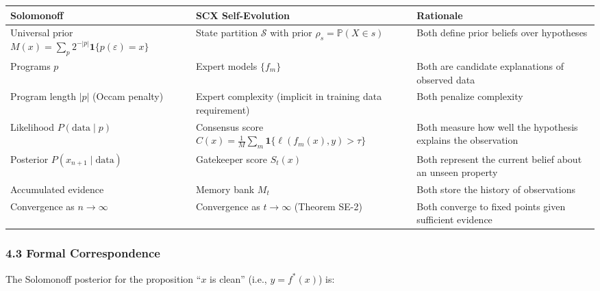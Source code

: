 \documentclass[
  12pt,
]{ctexart}
\begin{document}
\begin{longtable}[]{@{}
  >{\raggedright\arraybackslash}p{}
  >{\raggedright\arraybackslash}p{}
  >{\raggedright\arraybackslash}p{}@{}}
\toprule\noalign{}
\begin{minipage}[b]{\linewidth}\raggedright
Solomonoff
\end{minipage} & \begin{minipage}[b]{\linewidth}\raggedright
SCX Self-Evolution
\end{minipage} & \begin{minipage}[b]{\linewidth}\raggedright
Rationale
\end{minipage} \\
\midrule\noalign{}
\endhead
\bottomrule\noalign{}
\endlastfoot
Universal prior
\(M(x) = \sum_p 2^{-|p|}\mathbf{1}\{p(\varepsilon) = x\}\) & State
partition \(\mathcal{S}\) with prior \(\rho_s = \mathbb{P}(X \in s)\) &
Both define prior beliefs over hypotheses \\
Programs \(p\) & Expert models \(\{f_m\}\) & Both are candidate
explanations of observed data \\
Program length \(|p|\) (Occam penalty) & Expert complexity (implicit in
training data requirement) & Both penalize complexity \\
Likelihood \(P(\text{data} \mid p)\) & Consensus score
\(C(x) = \frac{1}{M}\sum_m \mathbf{1}\{\ell(f_m(x), y) > \tau\}\) & Both
measure how well the hypothesis explains the observation \\
Posterior \(P(x_{n+1} \mid \text{data})\) & Gatekeeper score \(S_t(x)\)
& Both represent the current belief about an unseen property \\
Accumulated evidence & Memory bank \(M_t\) & Both store the history of
observations \\
Convergence as \(n \to \infty\) & Convergence as \(t \to \infty\)
(Theorem SE-2) & Both converge to fixed points given sufficient
evidence \\
\end{longtable}

\subsubsection{4.3 Formal Correspondence}\label{formal-correspondence}

The Solomonoff posterior for the proposition ``\(x\) is clean'' (i.e.,
\(y = f^*(x)\)) is:
\end{document}
